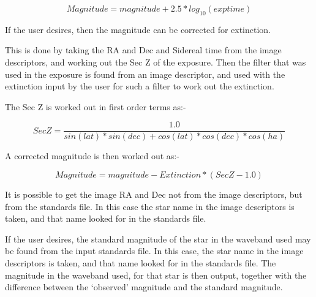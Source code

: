 {{    $$               Magnitude = magnitude + 2.5*log_{10}(exp time) $$

\vspace*{2mm}{\bf Correcting for Extinction }\vspace*{2mm}

  If the user desires, then the magnitude can be corrected for extinction.

  This is done by taking the RA and Dec and Sidereal time from the image
  descriptors, and working out the Sec Z of the exposure. Then the filter
  that was used in the exposure is found from an image descriptor, and
  used with the extinction input by the user for such a filter to work
  out the extinction.

  The Sec Z is worked out in first order terms as:-

  $$  SecZ =  \frac{1.0}{sin(lat)*sin(dec)+cos(lat)*cos(dec)*cos(ha)} $$

  A corrected magnitude is then worked out as:-

  $$                  Magnitude = magnitude - Extinction*(SecZ-1.0) $$

  It is possible to get the image RA and Dec not from the image 
  descriptors, but from the standards file. In this case the
  star name in the image descriptors is taken, and that name looked
  for in the standards file.

\vspace*{2mm}{\bf   Checking Against a Standard Magnitude}\vspace*{2mm}

  If the user desires, the standard magnitude of the star in the
  waveband used may be found from the input standards file. In this
  case, the star name in the image descriptors is taken, and that 
  name looked for in the standards file. The magnitude in the
  waveband used, for that star is then output, together with the
  difference between the `observed' magnitude and the standard
  magnitude.

}}

